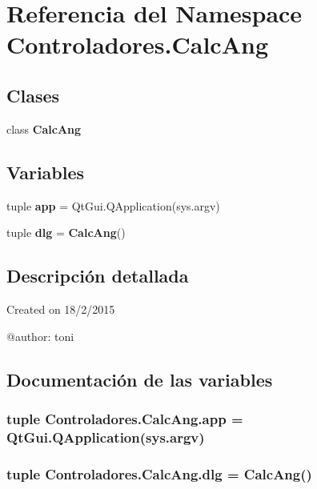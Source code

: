 \section{Referencia del Namespace Controladores.\-Calc\-Ang}
\label{namespaceControladores_1_1CalcAng}
\subsection*{Clases}
\begin{DoxyCompactItemize}
\item 
class {\bf Calc\-Ang}
\end{DoxyCompactItemize}
\subsection*{Variables}
\begin{DoxyCompactItemize}
\item 
tuple {\bf app} = Qt\-Gui.\-Q\-Application(sys.\-argv)
\item 
tuple {\bf dlg} = {\bf Calc\-Ang}()
\end{DoxyCompactItemize}


\subsection{Descripción detallada}
\begin{DoxyVerb}Created on 18/2/2015

@author: toni
\end{DoxyVerb}
 

\subsection{Documentación de las variables}
\subsubsection[{app}]{\setlength{\rightskip}{0pt plus 5cm}tuple Controladores.\-Calc\-Ang.\-app = Qt\-Gui.\-Q\-Application(sys.\-argv)}\label{namespaceControladores_1_1CalcAng_a5495fd1a534852bc1d657687a762d99c}
\subsubsection[{dlg}]{\setlength{\rightskip}{0pt plus 5cm}tuple Controladores.\-Calc\-Ang.\-dlg = {\bf Calc\-Ang}()}\label{namespaceControladores_1_1CalcAng_ae1ca2fb912563b2b94e1eedf9a02e2d6}
